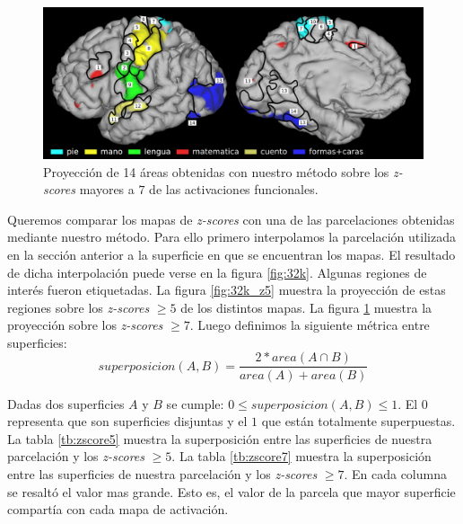 \begin{figure}[h!]
    \includegraphics[width=\textwidth]{img/32k_z7.png}
    \caption{Proyecci\'on de 14 \'areas obtenidas con nuestro m\'etodo
             sobre los \textit{z-scores} mayores a $7$ de las activaciones
             funcionales.}
    \label{fig:32k_z7}
\end{figure}


Queremos comparar los mapas de \textit{z-scores} con una de las 
parcelaciones obtenidas mediante nuestro m\'etodo. Para ello primero
interpolamos la parcelaci\'on utilizada en la secci\'on anterior a la
superficie en que se encuentran los mapas. El resultado de dicha 
interpolaci\'on puede verse en la figura \ref{fig:32k}. Algunas regiones
de inter\'es fueron etiquetadas. La figura \ref{fig:32k_z5} muestra la
proyecci\'on de estas regiones sobre los \textit{z-scores} $ \geq 5$ de
los distintos mapas. La figura \ref{fig:32k_z7} muestra la proyecci\'on
sobre los \textit{z-scores} $ \geq 7$. Luego definimos la siguiente 
m\'etrica entre superficies: \\

$$ superposicion(A,B) = \frac{ 2 * area(A \cap B) }{area(A) + area(B)} $$ 
 
Dadas dos superficies $A$ y $B$ se cumple: 
$0 \leq superposicion(A,B) \leq 1$. El $0$ representa que son superficies
disjuntas y el $1$ que est\'an totalmente superpuestas. La tabla 
\ref{tb:zscore5} muestra la superposici\'on entre las superficies de 
nuestra parcelaci\'on y los \textit{z-scores} $ \geq 5$.  La tabla 
\ref{tb:zscore7} muestra la superposici\'on entre las superficies de 
nuestra parcelaci\'on y los \textit{z-scores} $ \geq 7$. En cada columna
se resalt\'o el valor mas grande. Esto es, el valor de la parcela que
mayor superficie compart\'ia con cada mapa de activaci\'on.  \\
 

